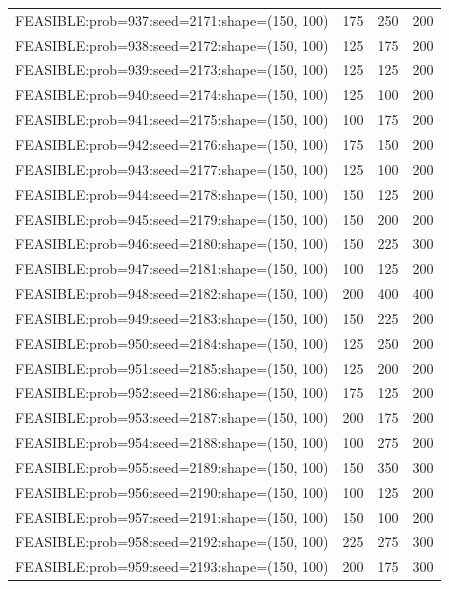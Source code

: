 \begin{longtable}{lccc}
FEASIBLE:prob=937:seed=2171:shape=(150, 100) &      175 &   250 &    200 \\
FEASIBLE:prob=938:seed=2172:shape=(150, 100) &      125 &   175 &    200 \\
FEASIBLE:prob=939:seed=2173:shape=(150, 100) &      125 &   125 &    200 \\
FEASIBLE:prob=940:seed=2174:shape=(150, 100) &      125 &   100 &    200 \\
FEASIBLE:prob=941:seed=2175:shape=(150, 100) &      100 &   175 &    200 \\
FEASIBLE:prob=942:seed=2176:shape=(150, 100) &      175 &   150 &    200 \\
FEASIBLE:prob=943:seed=2177:shape=(150, 100) &      125 &   100 &    200 \\
FEASIBLE:prob=944:seed=2178:shape=(150, 100) &      150 &   125 &    200 \\
FEASIBLE:prob=945:seed=2179:shape=(150, 100) &      150 &   200 &    200 \\
FEASIBLE:prob=946:seed=2180:shape=(150, 100) &      150 &   225 &    300 \\
FEASIBLE:prob=947:seed=2181:shape=(150, 100) &      100 &   125 &    200 \\
FEASIBLE:prob=948:seed=2182:shape=(150, 100) &      200 &   400 &    400 \\
FEASIBLE:prob=949:seed=2183:shape=(150, 100) &      150 &   225 &    200 \\
FEASIBLE:prob=950:seed=2184:shape=(150, 100) &      125 &   250 &    200 \\
FEASIBLE:prob=951:seed=2185:shape=(150, 100) &      125 &   200 &    200 \\
FEASIBLE:prob=952:seed=2186:shape=(150, 100) &      175 &   125 &    200 \\
FEASIBLE:prob=953:seed=2187:shape=(150, 100) &      200 &   175 &    200 \\
FEASIBLE:prob=954:seed=2188:shape=(150, 100) &      100 &   275 &    200 \\
FEASIBLE:prob=955:seed=2189:shape=(150, 100) &      150 &   350 &    300 \\
FEASIBLE:prob=956:seed=2190:shape=(150, 100) &      100 &   125 &    200 \\
FEASIBLE:prob=957:seed=2191:shape=(150, 100) &      150 &   100 &    200 \\
FEASIBLE:prob=958:seed=2192:shape=(150, 100) &      225 &   275 &    300 \\
FEASIBLE:prob=959:seed=2193:shape=(150, 100) &      200 &   175 &    300 \\

\end{longtable}
